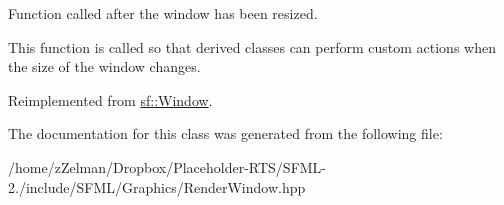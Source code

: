 Function called after the window has been resized. 

This function is called so that derived classes can perform custom actions when the size of the window changes. 

Reimplemented from \hyperlink{classsf_1_1Window_a10f567a387da7b49f417f73321fcf64d}{sf\-::\-Window}.



The documentation for this class was generated from the following file\-:\begin{DoxyCompactItemize}
\item 
/home/z\-Zelman/\-Dropbox/\-Placeholder-\/\-R\-T\-S/\-S\-F\-M\-L-\/2./include/\-S\-F\-M\-L/\-Graphics/Render\-Window.\-hpp\end{DoxyCompactItemize}
